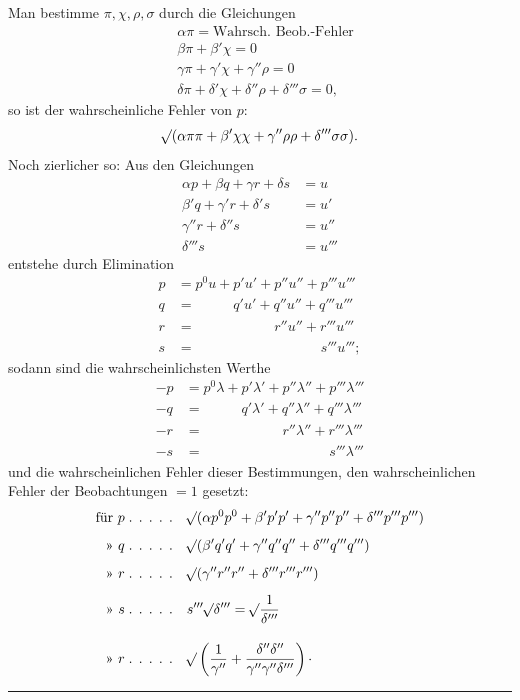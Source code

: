 Man bestimme \(\pi,\chi,\rho,\sigma\) durch die Gleichungen
\[
\begin{aligned}
&\alpha\pi=\text{Wahrsch. Beob.-Fehler}\\
&\beta\pi+\beta'\chi=0\\
&\gamma\pi+\gamma'\chi+\gamma''\rho=0\\
&\delta\pi+\delta'\chi+\delta''\rho+\delta'''\sigma=0,
\end{aligned}
\]
so ist der wahrscheinliche Fehler von \(p\):
\[
\mathord{{}^{}\!\surd}(\alpha\pi\pi+\beta'\chi\chi+\gamma''\rho\rho+\delta'''\sigma\sigma).
\]
Noch zierlicher so: Aus den Gleichungen
\[
\begin{aligned}
\alpha p+\beta q+\gamma r+\delta s&=u\\
\beta'q+\gamma'r+\delta's&=u'\\
\gamma''r+\delta''s&=u''\\
\delta'''s&=u'''
\end{aligned}
\]
entstehe durch Elimination
\[
\begin{aligned}
p&=p^0u+p'u'+p''u''+p'''u'''\\
q&=\phantom{p^0u+{}}q'u'+q''u''+q'''u'''\\
r&=\phantom{p^0u+p'u'+{}}r''u''+r'''u'''\\
s&=\phantom{p^0u+p'u'+p''u''+{}}s'''u''';
\end{aligned}
\]
sodann sind die wahrscheinlichsten Werthe
\[
\begin{aligned}
-p&=p^0\lambda+p'\lambda'+p''\lambda''+p'''\lambda'''\\
-q&=\phantom{p^0\lambda+{}}q'\lambda'+q''\lambda''+q'''\lambda'''\\
-r&=\phantom{p^0\lambda+p'\lambda'+{}}r''\lambda''+r'''\lambda'''\\
-s&=\phantom{p^0\lambda+p'\lambda'+p''\lambda''+{}}s'''\lambda'''
\end{aligned}
\]
und die wahrscheinlichen Fehler dieser Bestimmungen, den wahrscheinlichen Fehler der Beobachtungen \(=1\) gesetzt:
\[
\begin{aligned}
\text{für }p\;\text{. . . . .}\quad&\mathord{{}^{}\!\surd}(\alpha p^0p^0+\beta'p'p'+\gamma''p''p''+\delta'''p'''p''')\\[5pt]
\text{» }q\;\text{. . . . .}\quad&\mathord{{}^{}\!\surd}(\beta'q'q'+\gamma''q''q''+\delta'''q'''q''')\\[5pt]
\text{» }r\;\text{. . . . .}\quad&\mathord{{}^{}\!\surd}(\gamma''r''r''+\delta'''r'''r''')\\[5pt]
\text{» }s\;\text{. . . . .}\quad&s'''\mathord{{}^{}\!\surd}\delta'''=\mathord{{}^{}\!\surd}\frac{1}{\delta'''}\\[10pt]
\text{» }r\;\text{. . . . .}\quad&\mathord{{}^{}\!\surd}\left(\frac{1}{\gamma''}+\frac{\delta''\delta''}{\gamma''\gamma''\delta'''}\right)\mathpunct{\cdot}
\end{aligned}
\]
\begin{center}\rule{.18\textwidth}{.35pt}\end{center}
